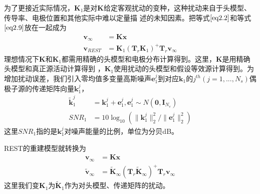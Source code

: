 为了更接近实际情况，$\mathbf{K}_1$是对$\mathbf{K}$给定客观扰动的变种，这种扰动来自于头模型、传导率、电极位置和其他实际中难以定量描
述的未知因素。把等式$\eqref{eq2.2}$和等式$\eqref{eq2.9}$放在一起成为
\begin{equation*}
\begin{split}
\mathbf{v}_{\infty}& =\mathbf{Kx}\\
\mathbf{v}_{REST}&
=\mathbf{K}_1(\mathbf{T}_r\mathbf{K}_1)^{+}\mathbf{T}_{r}\mathbf{v}_{\infty}
\end{split}
\end{equation*}
理想情况下$\mathbf{K}$和$\mathbf{K}_1$都需用精确的头模型和电极分布计算得到。这里，$\mathbf{K}$是用精确头模型和真正源活动计算得到
，$\mathbf{K}_1$使用扰动的头模型和假设等效源计算得到。为增加扰动误差，我们引入零均值多变量高斯噪声$\mathbf{e}_1^j$到对应$\mathbf{k}_1$的$j^{th}(j=1,...,N_s)$偶极子源的传递矩阵向量$\mathbf{k}_1^j$，
\begin{equation*}
\begin{split}
\tilde{\mathbf{k}}_1^j& =\mathbf{k}_1^j+\mathbf{e}_1^j,\mathbf{e}_1^j\sim{N(\mathbf{0},\mathbf{I}_{N_e})}\\
SNR_1& =10\log_{10}(\lVert\mathbf{k}_1^{j}\rVert_2^2/{\lVert\mathbf{e}_1^{j}\rVert_2^2})
\end{split}
\end{equation*}
这里$SNR_1$指的是$\mathbf{k}_1^j$对噪声能量的比例，单位为分贝dB。

REST的重建模型就转换为
\begin{equation}\label{eq2.10}
\begin{aligned}
\mathbf{v}_{\infty}& =\mathbf{Kx}\\
\tilde{\mathbf{v}}_{\infty}& =\tilde{\mathbf{K}}_{\infty}(\mathbf{T}_{r}\tilde{\mathbf{K}}_{\infty})^{+}\mathbf{T}_{r}\mathbf{v}_{\infty}
\end{aligned}
\end{equation}
这里我们变$\mathbf{K}_1$为$\tilde{\mathbf{K}}_1$作为对头模型、传递矩阵的扰动。


